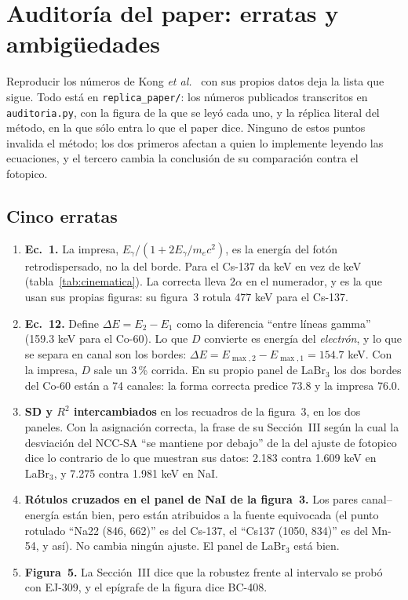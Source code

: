 \documentclass[11pt,a4paper]{article}
\begin{document}
\section{Auditoría del paper: erratas y ambigüedades}
\label{ap:auditoria}

Reproducir los números de Kong \emph{et al.}~\cite{kong2025} con sus propios
datos deja la lista que sigue. Todo está en \texttt{replica\_paper/}: los
números publicados transcritos en \texttt{auditoria.py}, con la figura de la
que se leyó cada uno, y la réplica literal del método, en la que sólo entra lo
que el paper dice. Ninguno de estos puntos invalida el método; los dos
primeros afectan a quien lo implemente leyendo las ecuaciones, y el tercero
cambia la conclusión de su comparación contra el fotopico.

\subsection{Cinco erratas}

\begin{enumerate}
\item \textbf{Ec.~1.} La impresa, $E_\gamma/(1+2E_\gamma/m_ec^2)$, es la
      energía del fotón retrodispersado, no la del borde. Para el Cs-137 da
      \EcUnoImpresaCs{} keV en vez de \BordeCs{} keV (tabla~\ref{tab:cinematica}).
      La correcta lleva $2\alpha$ en el numerador, y es la que usan sus
      propias figuras: su figura~3 rotula 477 keV para el Cs-137.
\item \textbf{Ec.~12.} Define $\Delta E = E_2 - E_1$ como la diferencia
      ``entre líneas gamma'' (159.3 keV para el Co-60). Lo que $D$ convierte
      es energía del \emph{electrón}, y lo que se separa en canal son los
      bordes: $\Delta E = E_{\max,2} - E_{\max,1} = 154.7$ keV. Con la
      impresa, $D$ sale un 3\,\% corrida. En su propio panel de LaBr$_3$ los
      dos bordes del Co-60 están a 74 canales: la forma correcta predice 73.8
      y la impresa 76.0.
\item \textbf{SD y $R^2$ intercambiados} en los recuadros de la figura~3, en
      los dos paneles. Con la asignación correcta, la frase de su Sección~III
      según la cual la desviación del NCC-SA ``se mantiene por debajo'' de la
      del ajuste de fotopico dice lo contrario de lo que muestran sus datos:
      2.183 contra 1.609 keV en LaBr$_3$, y 7.275 contra 1.981 keV en NaI.
\item \textbf{Rótulos cruzados en el panel de NaI de la figura~3.} Los pares
      canal--energía están bien, pero están atribuidos a la fuente
      equivocada (el punto rotulado ``Na22 (846, 662)'' es del Cs-137, el
      ``Cs137 (1050, 834)'' es del Mn-54, y así). No cambia ningún ajuste. El
      panel de LaBr$_3$ está bien.
\item \textbf{Figura~5.} La Sección~III dice que la robustez frente al
      intervalo se probó con EJ-309, y el epígrafe de la figura dice BC-408.
\end{enumerate}
\end{document}
